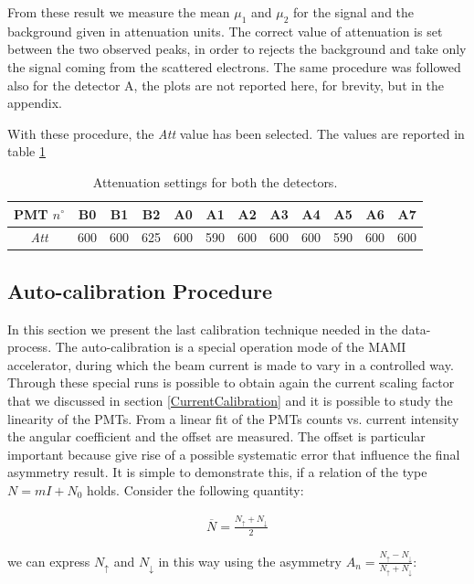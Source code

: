 From these result we measure the mean $\mu_{1}$ and $\mu_{2}$ for the signal and the background given in attenuation units. The correct value of attenuation is set between the two observed peaks, in order to rejects the background and take only the signal coming from the scattered electrons. The same procedure was followed also for the detector A, the plots are not reported here, for brevity, but in the appendix.

With these procedure, the \textit{Att} value has been selected. The values are reported in table \ref{tab:AttSettings}

\begin{table}[ht]
\centering
\begin{tabular}{cccccccccccc}
PMT $n^{\circ}$& B0 & B1 & B2 & A0 & A1 & A2 & A3 & A4 & A5 & A6 & A7 \\
\hline
\textit{Att} & 600 & 600 & 625 & 600 & 590 & 600 & 600 & 600 & 590 & 600 & 600 \\
\end{tabular}
\caption{Attenuation settings for both the detectors.}
\label{tab:AttSettings}
\end{table}


\subsection{Auto-calibration Procedure} \label{Autocalib}

In this section we present the last calibration technique needed in the data-process. The auto-calibration is a special operation mode of the MAMI accelerator, during which the beam current is made to vary in a controlled way. Through these special runs is possible to obtain again the current scaling factor that we discussed in section \ref{CurrentCalibration} and  it is possible to study the linearity of the PMTs. From a linear fit of the PMTs counts vs. current intensity the angular coefficient and the offset are measured. The offset is particular important because give rise of a possible systematic error that influence the final asymmetry result. It is simple to demonstrate this, if a relation of the type $N = mI + N_{0} $ holds. Consider the following quantity:

\begin{align*}
\overline{N} = \frac{N_{\uparrow} + N_{\downarrow}}{2}
\end{align*} 

we can express $N_{\uparrow}$ and $N_{\downarrow}$ in this way using the asymmetry $A_{n} = \frac{N_{\uparrow} - N_{\downarrow}}{N_{\uparrow} + N_{\downarrow}}$:

